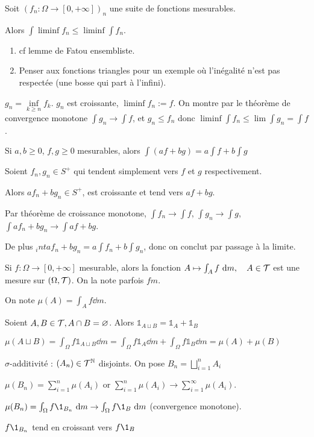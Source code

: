 \documentclass[10pt,a4paper,notitlepage ]{report}
\begin{document}
\begin{lemme}[Fatou]
	Soit $(f_n : \Omega \rightarrow [0,+\infty])_n$ une suite de fonctions mesurables.
	
	Alors $\int \liminf f_n \le \liminf \int f_n$.
\end{lemme}
\begin{rem}
	\begin{enumerate}
		\item cf lemme de Fatou ensembliste.
		\item Penser aux fonctions triangles pour un exemple où l'inégalité n'est pas respectée (une bosse qui part à l'infini).
	\end{enumerate}
\end{rem}

\begin{demo}
	$g_n = \underset{k\ge n}\inf f_k$. $g_n$ est croissante, $\liminf f_n := f$. On montre par le théorème de convergence monotone $\int g_n \rightarrow \int f$, et $g_n \le f_n$ donc $\liminf \int f_n \le \lim \int g_n = \int f$.
\end{demo}

\begin{propriete}
	Si $a,b \ge 0$, $f,g \ge 0$ mesurables, alors $\int(af+bg) = a\int f + b\int g$
\end{propriete}
\begin{demo}
	Soient $f_n, g_n \in S^+$ qui tendent simplement vers $f$ et $g$ respectivement.
	
	Alors $af_n+bg_n \in S^+$, est croissante et tend vers $af+bg$.
	
	Par théorème de croissance monotone, $\int f_n \rightarrow \int f$, $\int g_n \rightarrow \int g$, $\int af_n+bg_n \rightarrow \int af+bg$.
	
	De plus $_int af_n+bg_n = a\int f_n + b\int g_n$, donc on conclut par passage à la limite.
\end{demo}

\begin{propriete}
	Si $f:\Omega \rightarrow [0,+\infty]$ mesurable, alors la fonction $A \mapsto \int_A f\ \mathrm d m, \quad A\in \mathcal T$ est une mesure sur $(\Omega,\mathcal T)$. On la note parfois $fm$.
\end{propriete}
\begin{demo}
	On note $\mu(A) = \int_A f\dd m$.
	
	Soient $A,B\in \mathcal T, A\cap B = \varnothing$. Alors $\mathds 1_{A\sqcup B} = \mathds 1_A + \mathds 1_B$
	
	$\mu(A\sqcup B) = \int_\Omega f\mathds 1_{A\sqcup B} \dd m = \int_\Omega f \mathds 1_A \dd m + \int_\Omega f \mathds 1_B \dd m = \mu(A)+\mu(B)$


$\sigma$-additivité : $(A_n) \in \mathcal T^\mathbb N$ disjoints. On pose $B_n = \bigsqcup_{i=1}^n A_i$

$\mu(B_n)=\sum_{i=1}^n \mu(A_i)$ or $\sum_{i=1}^n \mu(A_i) \rightarrow \sum_{i=1}^\infty \mu(A_i)$.

$\mu(B_n) = \int_\Omega f \1_{B_n} \dd m \rightarrow \int_\Omega f \1_B \dd m$ (convergence monotone).

$f\1_{B_n}$ tend en croissant vers $f\1_B$
\end{demo}
\end{document}
